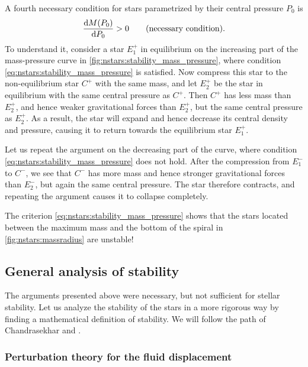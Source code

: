 A fourth necessary condition for stars parametrized by their central pressure $P_0$ is
\begin{equation}
	\odv{M(P_0)}{P_0} > 0
	\qquad \text{(necessary condition)} .
\label{eq:nstars:stability_mass_pressure}
\end{equation}
To understand it, consider a star $E_1^+$ in equilibrium on the increasing part of the mass-pressure curve in \cref{fig:nstars:stability_mass_pressure}, where condition \eqref{eq:nstars:stability_mass_pressure} is satisfied.
Now compress this star to the non-equilibrium star $C^+$ with the same mass, and let $E_2^+$ be the star in equilibrium with the same central pressure as $C^+$.
Then $C^+$ has less mass than $E_2^+$, and hence weaker gravitational forces than $E_2^+$, but the same central pressure as $E_2^+$.
As a result, the star will expand and hence decrease its central density and pressure, causing it to return towards the equilibrium star $E_1^+$.

Let us repeat the argument on the decreasing part of the curve, where condition \eqref{eq:nstars:stability_mass_pressure} does not hold.
After the compression from $E_1^-$ to $C^-$, we see that $C^-$ has more mass and hence stronger gravitational forces than $E_2^-$, but again the same central pressure.
The star therefore contracts, and repeating the argument causes it to collapse completely.

The criterion \eqref{eq:nstars:stability_mass_pressure} shows that the stars located between the maximum mass and the bottom of the spiral in \cref{fig:nstars:massradius} are unstable!

\subsection{General analysis of stability}
\label{sec:nstars:stability_general}

The arguments presented above were necessary, but not sufficient for stellar stability.
Let us analyze the stability of the stars in a more rigorous way by finding a mathematical definition  of stability.
We will follow the path of Chandrasekhar \cite{ref:chandrasekhar_stability} and \cite[§ 26.4d]{ref:mtw}.

\subsubsection{Perturbation theory for the fluid displacement}

